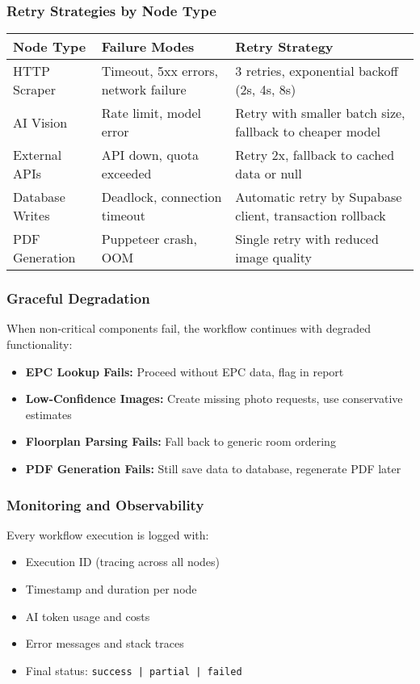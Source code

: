 \documentclass[11pt,a4paper]{article}
\begin{document}
\subsubsection{Retry Strategies by Node Type}

\begin{longtable}{@{}p{3.5cm}p{5cm}p{5.5cm}@{}}
\toprule
\textbf{Node Type} & \textbf{Failure Modes} & \textbf{Retry Strategy} \\
\midrule
HTTP Scraper & Timeout, 5xx errors, network failure & 3 retries, exponential backoff (2s, 4s, 8s) \\
\addlinespace
AI Vision & Rate limit, model error & Retry with smaller batch size, fallback to cheaper model \\
\addlinespace
External APIs & API down, quota exceeded & Retry 2x, fallback to cached data or null \\
\addlinespace
Database Writes & Deadlock, connection timeout & Automatic retry by Supabase client, transaction rollback \\
\addlinespace
PDF Generation & Puppeteer crash, OOM & Single retry with reduced image quality \\
\bottomrule
\end{longtable}

\subsubsection{Graceful Degradation}

When non-critical components fail, the workflow continues with degraded functionality:

\begin{itemize}
  \item \textbf{EPC Lookup Fails:} Proceed without EPC data, flag in report
  \item \textbf{Low-Confidence Images:} Create missing photo requests, use conservative estimates
  \item \textbf{Floorplan Parsing Fails:} Fall back to generic room ordering
  \item \textbf{PDF Generation Fails:} Still save data to database, regenerate PDF later
\end{itemize}

\subsubsection{Monitoring and Observability}

Every workflow execution is logged with:
\begin{itemize}
  \item Execution ID (tracing across all nodes)
  \item Timestamp and duration per node
  \item AI token usage and costs
  \item Error messages and stack traces
  \item Final status: \texttt{success | partial | failed}
\end{itemize}
\end{document}
